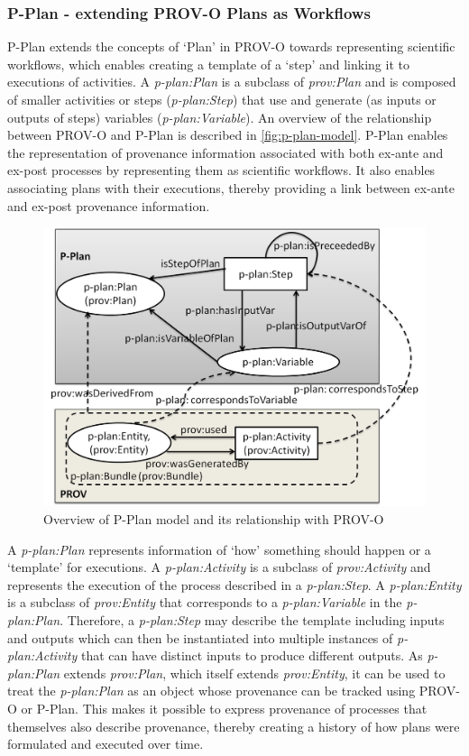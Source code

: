 \subsubsection{P-Plan - extending PROV-O Plans as Workflows}
P-Plan \cite{} extends the concepts of `Plan' in PROV-O towards representing scientific
workflows, which enables creating a template of a `step' and linking it to executions of activities.
A \textit{p-plan:Plan} is a subclass of \textit{prov:Plan} and is composed of smaller activities or steps (\textit{p-plan:Step}) that use and generate (as inputs or outputs of steps) variables (\textit{p-plan:Variable}).
An overview of the relationship between PROV-O and P-Plan is described in \autoref{fig:p-plan-model}.
P-Plan enables the representation of provenance information associated with both ex-ante and ex-post processes by representing them as scientific workflows. It also enables associating plans with their executions, thereby providing a link between ex-ante and ex-post provenance information.
\begin{figure}[htbp]
    \centering
    \includegraphics[width=0.75\linewidth]{img/p-plan-model.png}
    \caption{Overview of P-Plan model and its relationship with PROV-O \cite{}}
    \label{fig:p-plan-model}
\end{figure}

A \textit{p-plan:Plan} represents information of `how’ something should happen or a ‘template’ for executions. A \textit{p-plan:Activity} is a subclass of \textit{prov:Activity} and represents the execution of the process described in a \textit{p-plan:Step}.
A \textit{p-plan:Entity} is a subclass of \textit{prov:Entity} that corresponds to a \textit{p-plan:Variable} in the \textit{p-plan:Plan}. Therefore, a
\textit{p-plan:Step} may describe the template including inputs and outputs which can
then be instantiated into multiple instances of \textit{p-plan:Activity} that can have
distinct inputs to produce different outputs.
As \textit{p-plan:Plan} extends \textit{prov:Plan}, which itself extends \textit{prov:Entity}, it can be
used to treat the \textit{p-plan:Plan} as an object whose provenance can be tracked using
PROV-O or P-Plan. This makes it possible to express provenance of processes that themselves also describe provenance, thereby creating a history of how plans were formulated and executed over time.

